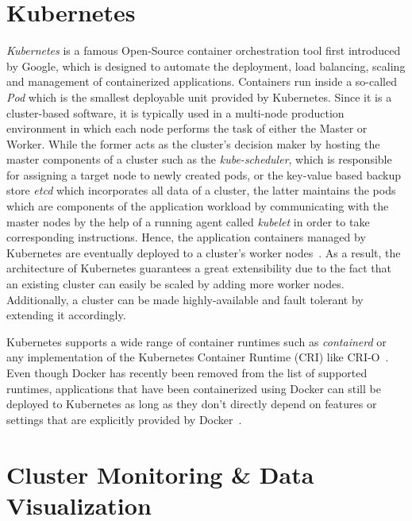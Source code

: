 \section{Kubernetes}
\textit{Kubernetes} is a famous Open-Source container orchestration tool first introduced by Google, which is designed to automate the deployment, load balancing, scaling and management of containerized applications. Containers run inside a so-called \textit{Pod} which is the smallest deployable unit provided by Kubernetes. Since it is a cluster-based software, it is typically used in a multi-node production environment in which each node performs the task of either the Master or Worker. While the former acts as the cluster's decision maker by hosting the master components of a cluster such as the \textit{kube-scheduler}, which is responsible for assigning a target node to newly created pods, or the key-value based backup store \textit{etcd} which incorporates all data of a cluster, the latter maintains the pods which are components of the application workload by communicating with the master nodes by the help of a running agent called \textit{kubelet} in order to take corresponding instructions. Hence, the application containers managed by Kubernetes are eventually deployed to a cluster's worker nodes~\parencite{k8s-components}. As a result, the architecture of Kubernetes guarantees a great extensibility due to the fact that an existing cluster can easily be scaled by adding more worker nodes. Additionally, a cluster can be made highly-available and fault tolerant by extending it accordingly.

Kubernetes supports a wide range of container runtimes such as \textit{containerd} or any implementation of the Kubernetes Container Runtime (CRI) like CRI-O~\parencite{k8s-components}. Even though Docker has recently been removed from the list of supported runtimes, applications that have been containerized using Docker can still be deployed to Kubernetes as long as they don't directly depend on features or settings that are explicitly provided by Docker~\parencite{k8s-docker-drop}.

\section{Cluster Monitoring \& Data Visualization}
